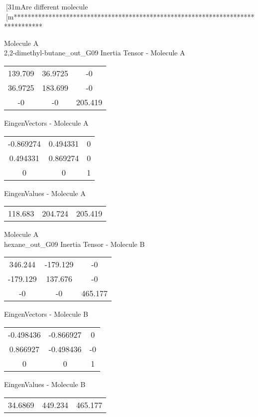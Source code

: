 [31mAre different molecule
[m********************************************************************************
\newpage
\begin{multicols}{2}
\begin{center}
Molecule A \\ 
2,2-dimethyl-butane_out_G09
Inertia Tensor - Molecule A \\
\vtab
\begin{tabular}{|c c c|}
139.709	 & 	36.9725	 & 	-0	 \\
36.9725	 & 	183.699	 & 	-0	 \\
-0	 & 	-0	 & 	205.419
\end{tabular}

\vtab
 EingenVectors - Molecule A     \\
\vtab
\begin{tabular}{|c c c|}
-0.869274	 & 	0.494331	 & 	0	 \\
0.494331	 & 	0.869274	 & 	0	 \\
0	 & 	0	 & 	1
\end{tabular}

\vtab
 EingenValues - Molecule A     \\
\vtab
\begin{tabular}{|c c c|}
118.683	 & 	204.724	 & 	205.419
\end{tabular}
\columnbreak
Molecule A \\ 
hexane_out_G09
Inertia Tensor - Molecule B \\
\vtab
\begin{tabular}{|c c c|}
346.244	 & 	-179.129	 & 	-0	 \\
-179.129	 & 	137.676	 & 	-0	 \\
-0	 & 	-0	 & 	465.177
\end{tabular}

\vtab
 EingenVectors - Molecule B     \\
\vtab
\begin{tabular}{|c c c|}
-0.498436	 & 	-0.866927	 & 	0	 \\
0.866927	 & 	-0.498436	 & 	-0	 \\
0	 & 	0	 & 	1
\end{tabular}

\vtab
 EingenValues - Molecule B     \\
\vtab
\begin{tabular}{|c c c|}
34.6869	 & 	449.234	 & 	465.177
\end{tabular}
\end{center}
\end{multicols}
